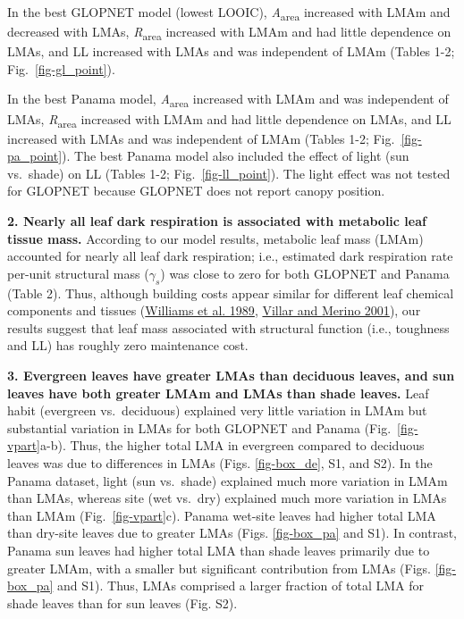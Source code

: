 \documentclass[
  12pt,
  letterpaper,
  DIV=11,
  numbers=noendperiod]{scrartcl}
\begin{document}
In the best GLOPNET model (lowest LOOIC), \emph{A}\textsubscript{area}
increased with LMAm and decreased with LMAs,
\emph{R}\textsubscript{area} increased with LMAm and had little
dependence on LMAs, and LL increased with LMAs and was independent of
LMAm (Tables 1-2; Fig.~\ref{fig-gl_point}).

In the best Panama model, \emph{A}\textsubscript{area} increased with
LMAm and was independent of LMAs, \emph{R}\textsubscript{area} increased
with LMAm and had little dependence on LMAs, and LL increased with LMAs
and was independent of LMAm (Tables 1-2; Fig.~\ref{fig-pa_point}). The
best Panama model also included the effect of light (sun vs.~shade) on
LL (Tables 1-2; Fig.~\ref{fig-ll_point}). The light effect was not
tested for GLOPNET because GLOPNET does not report canopy position.

\textbf{2. Nearly all leaf dark respiration is associated with metabolic
leaf tissue mass.} According to our model results, metabolic leaf mass
(LMAm) accounted for nearly all leaf dark respiration; i.e., estimated
dark respiration rate per-unit structural mass (\(\gamma_s\)) was close
to zero for both GLOPNET and Panama (Table 2). Thus, although building
costs appear similar for different leaf chemical components and tissues
(\protect\hyperlink{ref-Williams1989}{Williams et al. 1989},
\protect\hyperlink{ref-Villar2001}{Villar and Merino 2001}), our results
suggest that leaf mass associated with structural function (i.e.,
toughness and LL) has roughly zero maintenance cost.

\textbf{3. Evergreen leaves have greater LMAs than deciduous leaves, and
sun leaves have both greater LMAm and LMAs than shade leaves.} Leaf
habit (evergreen vs.~deciduous) explained very little variation in LMAm
but substantial variation in LMAs for both GLOPNET and Panama
(Fig.~\ref{fig-vpart}a-b). Thus, the higher total LMA in evergreen
compared to deciduous leaves was due to differences in LMAs (Figs.
\ref{fig-box_de}, S1, and S2). In the Panama dataset, light (sun
vs.~shade) explained much more variation in LMAm than LMAs, whereas site
(wet vs.~dry) explained much more variation in LMAs than LMAm
(Fig.~\ref{fig-vpart}c). Panama wet-site leaves had higher total LMA
than dry-site leaves due to greater LMAs (Figs. \ref{fig-box_pa} and
S1). In contrast, Panama sun leaves had higher total LMA than shade
leaves primarily due to greater LMAm, with a smaller but significant
contribution from LMAs (Figs. \ref{fig-box_pa} and S1). Thus, LMAs
comprised a larger fraction of total LMA for shade leaves than for sun
leaves (Fig. S2).
\end{document}
